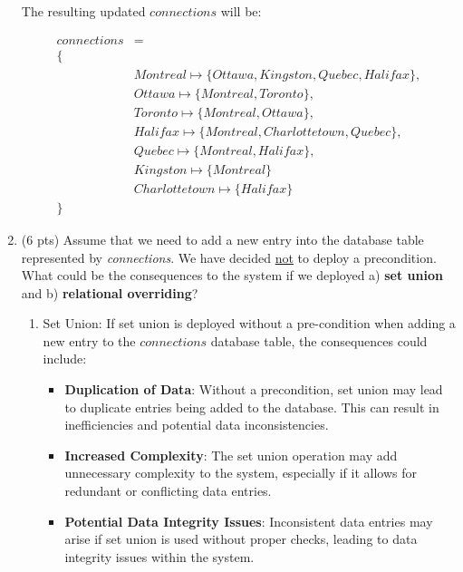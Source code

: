 \documentclass[12pt]{article}
\begin{document}
\begin{spacing}{1.5}
\begin{enumerate}
		      	The resulting updated $connections$ will be:
		      	    
		      	\begin{align*}
		      	connections & =                                                       \\
		      	\{ \\
		      	            & Montreal \mapsto \{Ottawa, Kingston, Quebec, Halifax\}, \\
		      	            & Ottawa \mapsto \{Montreal, Toronto\},                   \\
		      	            & Toronto \mapsto \{Montreal, Ottawa\},                   \\
		      	            & Halifax \mapsto \{Montreal, Charlottetown, Quebec\},                                 \\
		      	            & Quebec \mapsto \{Montreal, Halifax\},                   \\
		      	            & Kingston \mapsto \{Montreal\}                           \\
                            & Charlottetown \mapsto \{Halifax\}
                                              \\
		      	\}
		      \end{align*}
		      
		\item (6 pts) Assume that we need to add a new entry into the database table represented by \textit{connections}. We have decided \underline{not} to deploy a precondition. What could be the consequences to the system if we deployed a) \textbf{set union} and b) \textbf{relational overriding}?\newline

        \begin{enumerate}
            \item Set Union:
            If set union is deployed without a pre-condition when adding a new entry to the $connections$ database table, the consequences could include:

            \begin{itemize}
                \item \textbf{Duplication of Data}: Without a precondition, set union may lead to duplicate entries being added to the database. This can result in inefficiencies and potential data inconsistencies.
                \item \textbf{Increased Complexity}: The set union operation may add unnecessary complexity to the system, especially if it allows for redundant or conflicting data entries.
                \item \textbf{Potential Data Integrity Issues}: Inconsistent data entries may arise if set union is used without proper checks, leading to data integrity issues within the system.  
            \end{itemize}


\end{enumerate}
\end{enumerate}
\end{spacing}
\end{document}
